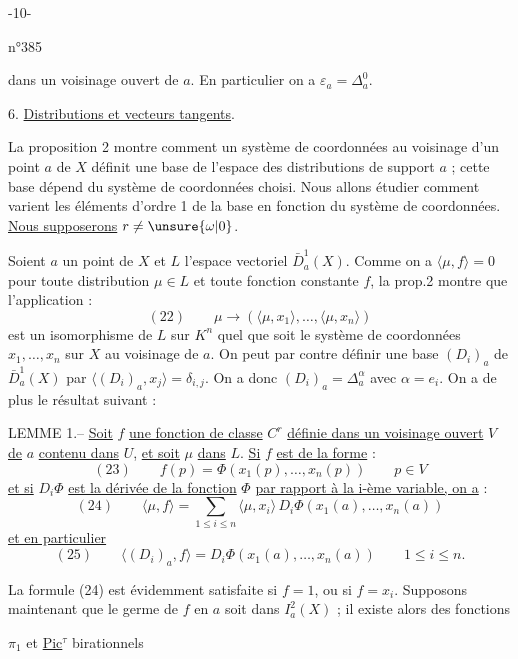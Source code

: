 \begin{center}-10-\end{center}
\begin{flushright}n°385\end{flushright}
dans un voisinage ouvert de $a$. En particulier on a $\varepsilon_a=\Delta_a^0$.

6. \uline{Distributions et vecteurs tangents}.

La proposition 2 montre comment un système de coordonnées au voisinage d'un point $a$ de $X$ définit une base de l'espace des distributions de support $a$ ; cette base dépend du système de coordonnées choisi. Nous allons étudier comment varient les éléments d'ordre 1 de la base en fonction du système de coordonnées. \uline{Nous supposerons} $r\neq\unsure{\omega|0}$.

Soient $a$ un point de $X$ et $L$ l'espace vectoriel $\bar D_a^1(X)$. Comme on a $\langle\mu,f\rangle=0$ pour toute distribution $\mu\in L$ et toute fonction constante $f$, la prop.2 montre que l'application :
\[
(22)\qquad \mu\longrightarrow(\langle\mu,x_1\rangle,\ldots,\langle\mu,x_n\rangle)
\]
est un isomorphisme de $L$ sur $K^n$ quel que soit le système de coordonnées $x_1,\ldots,x_n$ sur $X$ au voisinage de $a$. On peut par contre définir une base $(D_i)_a$ de $\bar D_a^1(X)$ par $\langle(D_i)_a,x_j\rangle=\delta_{i,j}$. On a donc $(D_i)_a=\Delta_a^\alpha$ avec $\alpha=e_i$. On a de plus le résultat suivant :

LEMME 1.-- \uline{Soit} $f$ \uline{une fonction de classe} $C^r$ \uline{définie dans un voisinage ouvert} $V$ \uline{de} $a$ \uline{contenu dans} $U$, \uline{et soit} $\mu$ \uline{dans} $L$. \uline{Si} $f$ \uline{est de la forme} :
\[
(23)\qquad f(p)=\Phi(x_1(p),\ldots,x_n(p))
\qquad p\in V
\]
\uline{et si} $D_i\Phi$ \uline{est la dérivée de la fonction} $\Phi$ \uline{par rapport à la i-ème variable, on a} :
\[
(24)\qquad
\langle\mu,f\rangle=\sum_{1\leq i\leq n}\langle\mu,x_i\rangle\,D_i\Phi(x_1(a),\ldots,x_n(a))
\]
\uline{et en particulier}
\[
(25)\qquad
\langle(D_i)_a,f\rangle=D_i\Phi(x_1(a),\ldots,x_n(a))
\qquad 1\leq i\leq n.
\]

La formule (24) est évidemment satisfaite si $f=1$, ou si $f=x_i$. Supposons maintenant que le germe de $f$ en $a$ soit dans $I_a^2(X)$ ; il existe alors des fonctions

\begin{flushright}
$\pi_1$ et \uline{Pic}$^\tau$ birationnels
\end{flushright}

